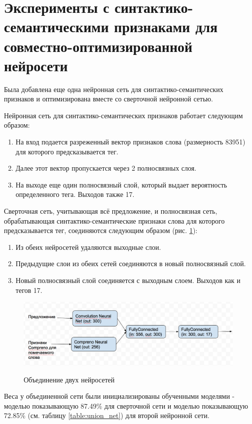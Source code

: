 \section{Эксперименты с синтактико-семантическими признаками для совместно-оптимизированной нейросети}

Была добавлена еще одна нейронная сеть для синтактико-семантических признаков и оптимизирована
вместе со сверточной нейронной сетью.

Нейронная сеть для синтактико-семантических признаков работает следующим образом:
\begin{enumerate}
  \item На вход подается разреженный вектор признаков слова (размерность 83951) для которого предсказывается тег.
  \item Далее этот вектор пропускается через 2 полносвязных слоя.
  \item На выходе еще один полносвязный слой, который выдает вероятность определенного тега.
  Выходов также 17.
\end{enumerate}

Сверточная сеть, учитывающая всё предложение, и полносвязная сеть, обрабатывающая
синтактико-семантические признаки слова для которого предсказывается тег, соединяются следующим
образом (рис. \ref{figure:union_net}):
\begin{enumerate}
  \item Из обеих нейросетей удаляются выходные слои.
  \item Предыдущие слои из обеих сетей соединяются в новый полносвязный слой.
  \item Новый полносвязный слой соединяется с выходным слоем. Выходов как и тегов 17.
\end{enumerate}

\begin{figure}[h]
  \caption{Объединение двух нейросетей}
  \includegraphics[scale=0.5]{figures/two-net.png}
  \label{figure:union_net}
\end{figure}

Веса у объединенной сети были инициализированы обученными моделями -
моделью показывающую 87.49\% для сверточной сети и моделью показывающую
72.85\% (см. таблицу \ref{table:union_net}) для второй нейронной сети.

